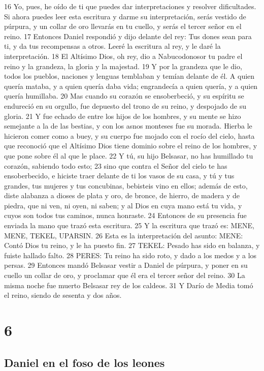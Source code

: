 16 Yo, pues, he oído de ti que puedes dar interpretaciones y resolver dificultades. Si ahora puedes leer esta escritura y darme su interpretación, serás vestido de púrpura, y un collar de oro llevarás en tu cuello, y serás el tercer señor en el reino.
17 Entonces Daniel respondió y dijo delante del rey: Tus dones sean para ti, y da tus recompensas a otros. Leeré la escritura al rey, y le daré la interpretación.
18 El Altísimo Dios, oh rey, dio a Nabucodonosor tu padre el reino y la grandeza, la gloria y la majestad.
19 Y por la grandeza que le dio, todos los pueblos, naciones y lenguas temblaban y temían delante de él. A quien quería mataba, y a quien quería daba vida; engrandecía a quien quería, y a quien quería humillaba.
20 Mas cuando su corazón se ensoberbeció, y su espíritu se endureció en su orgullo, fue depuesto del trono de su reino, y despojado de su gloria.
21 Y fue echado de entre los hijos de los hombres, y su mente se hizo semejante a la de las bestias, y con los asnos monteses fue su morada. Hierba le hicieron comer como a buey, y su cuerpo fue mojado con el rocío del cielo, hasta que reconoció que el Altísimo Dios tiene dominio sobre el reino de los hombres, y que pone sobre él al que le place.
22 Y tú, su hijo Belsasar, no has humillado tu corazón, sabiendo todo esto;
23 sino que contra el Señor del cielo te has ensoberbecido, e hiciste traer delante de ti los vasos de su casa, y tú y tus grandes, tus mujeres y tus concubinas, bebisteis vino en ellos; además de esto, diste alabanza a dioses de plata y oro, de bronce, de hierro, de madera y de piedra, que ni ven, ni oyen, ni saben; y al Dios en cuya mano está tu vida, y cuyos son todos tus caminos, nunca honraste.
24 Entonces de su presencia fue enviada la mano que trazó esta escritura.
25 Y la escritura que trazó es: MENE, MENE, TEKEL, UPARSIN.
26 Esta es la interpretación del asunto: MENE: Contó Dios tu reino, y le ha puesto fin.
27 TEKEL: Pesado has sido en balanza, y fuiste hallado falto.
28 PERES: Tu reino ha sido roto, y dado a los medos y a los persas.
29 Entonces mandó Belsasar vestir a Daniel de púrpura, y poner en su cuello un collar de oro, y proclamar que él era el tercer señor del reino.
30 La misma noche fue muerto Belsasar rey de los caldeos.
31 Y Darío de Media tomó el reino, siendo de sesenta y dos años. 

\chapter{6}

\section*{Daniel en el foso de los leones}

